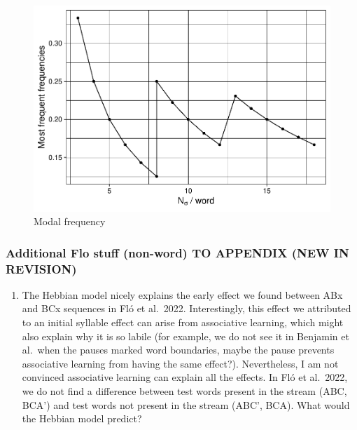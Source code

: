 \documentclass[
]{article}
\providecommand{\tightlist}{%
  \setlength{\itemsep}{0pt}\setlength{\parskip}{0pt}}
\begin{document}
\begin{figure}
\includegraphics[width=1\linewidth]{tp_model_entrainment_files/figure-latex/basic-experiment-global-by-n-syll-modal-freq-plot-1} \caption{Modal frequency}\label{fig:basic-experiment-global-by-n-syll-modal-freq-plot}
\end{figure}

\hypertarget{additional-flo-stuff-non-word-to-appendix-new-in-revision}{%
\subsubsection{Additional Flo stuff (non-word) TO APPENDIX (NEW IN
REVISION)}\label{additional-flo-stuff-non-word-to-appendix-new-in-revision}}

\begin{enumerate}
\def\labelenumi{\arabic{enumi}.}
\setcounter{enumi}{9}
\tightlist
\item
  The Hebbian model nicely explains the early effect we found between
  ABx and BCx sequences in Fló et al.~2022. Interestingly, this effect
  we attributed to an initial syllable effect can arise from associative
  learning, which might also explain why it is so labile (for example,
  we do not see it in Benjamin et al.~when the pauses marked word
  boundaries, maybe the pause prevents associative learning from having
  the same effect?). Nevertheless, I am not convinced associative
  learning can explain all the effects. In Fló et al.~2022, we do not
  find a difference between test words present in the stream (ABC, BCA')
  and test words not present in the stream (ABC', BCA). What would the
  Hebbian model predict?
\end{enumerate}
\end{document}
